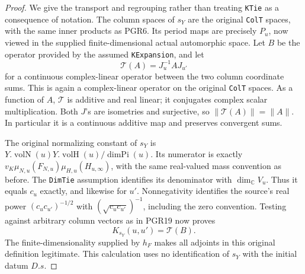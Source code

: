 \begin{proof}
We give the transport and regrouping rather than treating
\texttt{KTie} as a consequence of notation.  The column spaces
of \(s_Y\) are the original \texttt{ColT} spaces, with the
same inner products as PGR6.  Its period maps are precisely
\(P_u\), now viewed in the supplied finite-dimensional actual
automorphic space.  Let \(B\) be the operator provided by the
assumed \texttt{KExpansion}, and let
\[
       \mathcal T(A)=J_u^{-1} A J_{u'}
\tag{PGR.56}
\]
for a continuous complex-linear operator between the two column
coordinate sums.  This is again a complex-linear operator on the
original \texttt{ColT} spaces.  As a function of \(A\),
\(\mathcal T\) is additive and real linear; it conjugates
complex scalar multiplication.  Both \(J\)'s are isometries
and surjective, so
\(\|\mathcal T(A)\|=\|A\|\).
In particular it is a continuous additive map and preserves
convergent sums.

The original normalizing constant of \(s_Y\) is
\(Y.\operatorname{volN}(u)Y.\operatorname{volH}(u)/
\operatorname{dimPi}(u)\).  Its numerator is exactly
\(v_K\mu_{N,u}(F_{N,u})\mu_{H,u}(H_{u,\infty})\),
with the same real-valued mass convention as before.  The
\texttt{DimTie} assumption identifies its denominator with
\(\dim_{\mathbb C}V_u\).  Thus it equals \(c_u\) exactly,
and likewise for \(u'\).  Nonnegativity identifies the source's
real power \((c_uc_{u'})^{-1/2}\) with
\((\sqrt{c_uc_{u'}})^{-1}\), including the zero convention.
Testing against arbitrary column vectors as in PGR19 now proves
\[
                 K_{s_Y}(u,u')=\mathcal T(B).
\tag{PGR.57}
\]
The finite-dimensionality supplied by \(h_F\) makes all
adjoints in this original definition legitimate.  This calculation
uses no identification of \(s_Y\) with the initial datum \(D.s\).


\end{proof}

